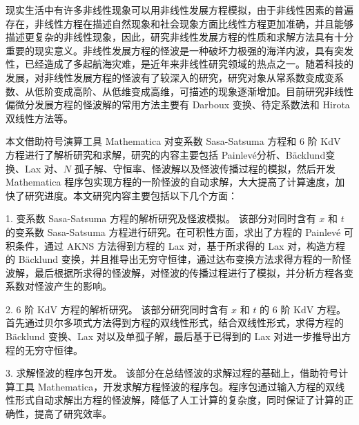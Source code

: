 


\begin{cabstract}
现实生活中有许多非线性现象可以用非线性发展方程模拟，由于非线性因素的普遍存在，非线性方程在描述自然现象和社会现象方面比线性方程更加准确，并且能够描述更复杂的非线性现象，因此，研究非线性发展方程的性质和求解方法具有十分重要的现实意义。非线性发展方程的怪波是一种破坏力极强的海洋内波，具有突发性，已经造成了多起航海灾难，是近年来非线性研究领域的热点之一。随着科技的发展，对非线性发展方程的怪波有了较深入的研究，研究对象从常系数变成变系数、从低阶变成高阶、从低维变成高维，可描述的现象逐渐增加。目前研究非线性偏微分发展方程的怪波解的常用方法主要有 Darboux 变换、待定系数法和 Hirota 双线性方法等。

本文借助符号演算工具 Mathematica 对变系数 Sasa-Satsuma 方程和 6 阶 KdV 方程进行了解析研究和求解，研究的内容主要包括 Painlev\'{e}分析、B\"{a}cklund变换、Lax 对、$N$ 孤子解、守恒率、怪波解以及怪波传播过程的模拟，然后开发 Mathematica 程序包实现方程的一阶怪波的自动求解，大大提高了计算速度，加快了研究进度。本文研究内容主要包括以下几个方面：

1. 变系数 Sasa-Satsuma 方程的解析研究及怪波模拟。
该部分对同时含有 $x$ 和 $t$ 的变系数 Sasa-Satsuma 方程进行研究。在可积性方面，求出了方程的 Painlev\'{e} 可积条件，通过 AKNS 方法得到方程的 Lax 对，基于所求得的 Lax 对，构造方程的 B\"{a}cklund 变换，并且推导出无穷守恒律，通过达布变换方法求得方程的一阶怪波解，最后根据所求得的怪波解，对怪波的传播过程进行了模拟，并分析方程各变系数对怪波产生的影响。

2. 6 阶 KdV 方程的解析研究。
该部分研究同时含有 $x$ 和 $t$ 的 6 阶 KdV 方程。首先通过贝尔多项式方法得到方程的双线性形式，结合双线性形式，求得方程的 B\"{a}cklund 变换、Lax 对以及单孤子解，最后基于已得到的 Lax 对进一步推导出方程的无穷守恒律。

3. 求解怪波的程序包开发。
该部分在总结怪波的求解过程的基础上，借助符号计算工具 Mathematica，开发求解方程怪波的程序包。程序包通过输入方程的双线性形式自动求解出方程的怪波解，降低了人工计算的复杂度，同时保证了计算的正确性，提高了研究效率。
\end{cabstract}


